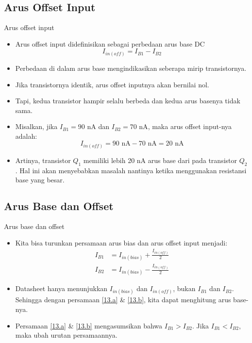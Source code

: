 \documentclass[aspectratio=169]{beamer}
\begin{document}
\subsection{Arus Offset Input}
\begin{frame}{Arus offset input}
	\begin{itemize}
		\item Arus offset input didefinisikan sebagai perbedaan arus base DC
		\begin{equation}
			I_{in(off)} = I_{B1} - I_{B2}
		\end{equation}
		\item Perbedaan di dalam arus base mengindikasikan seberapa mirip transistornya.
		\item Jika transistornya identik, arus offset inputnya akan bernilai nol.
		\item Tapi, kedua transistor hampir selalu berbeda dan kedua arus basenya tidak sama.
		\item Misalkan, jika $ I_{B1} = 90 \text{ nA} $ dan $ I_{B2} = 70 \text{ nA} $, maka arus offset input-nya adalah:
		\[ I_{in(off)} = 90 \text{ nA} - 70 \text{ nA} = 20 \text{ nA}\]
		\item Artinya, transistor $ Q_1 $ memiliki lebih 20 nA arus base dari pada transistor $ Q_2 $. Hal ini akan menyebabkan masalah nantinya ketika menggunakan resistansi base yang besar.
	\end{itemize}
\end{frame}

\subsection{Arus Base dan Offset}
\begin{frame}{Arus base dan offset}
	\begin{itemize}
		\item Kita bisa turunkan persamaan arus bias dan arus offset input menjadi:
		\begin{align*}
			I_{B1} &= I_{in(bias)} + \frac{I_{in(off)}}{2} \tag{13.a} \label{13.a}\\
			I_{B2} &= I_{in(bias)} - \frac{I_{in(off)}}{2}	\tag{13.b} \label{13.b}
		\end{align*}
		\item Datasheet hanya menunjukkan $ I_{in(bias)} $ dan $ I_{in(off)} $, bukan $ I_{B1} $ dan $ I_{B2} $. Sehingga dengan persamaan \ref{13.a} \& \ref{13.b}, kita dapat menghitung arus base-nya.
		\item Persamaan \ref{13.a} \& \ref{13.b} mengasumsikan bahwa $ I_{B1} > I_{B2} $. Jika $ I_{B1} < I_{B2} $, maka ubah urutan persamaannya.
	\end{itemize}
\end{frame}
\end{document}

